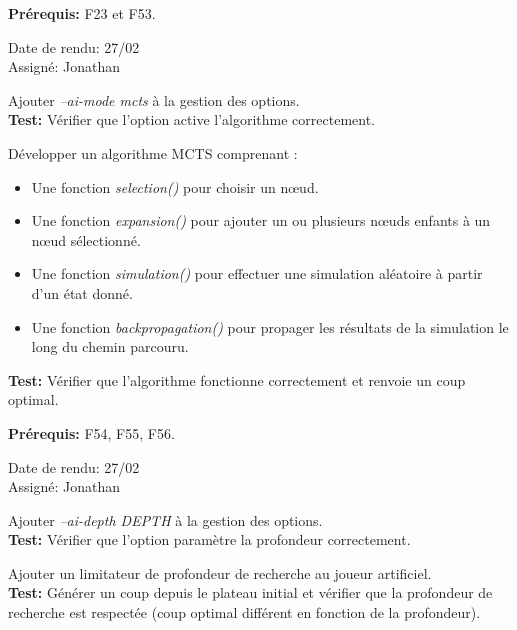 \documentclass{article}
\begin{document}
\begin{needbox}
    \textbf{Prérequis:} F23 et F53.
    \begin{duedatebox}
        Date de rendu: 27/02\\
        Assigné: Jonathan
    \end{duedatebox}
    \begin{subneedbox}
        Ajouter \textit{--ai-mode mcts} à la gestion des options.\\
        \textbf{Test:} Vérifier que l'option active l'algorithme correctement.
    \end{subneedbox}

    \begin{subneedbox}
        Développer un algorithme MCTS comprenant :
        \begin{itemize}
            \item Une fonction \textit{selection()} pour choisir un nœud.
            \item Une fonction \textit{expansion()} pour ajouter un ou plusieurs nœuds enfants à un nœud sélectionné.
            \item Une fonction \textit{simulation()} pour effectuer une simulation aléatoire à partir d'un état donné.
            \item Une fonction \textit{backpropagation()} pour propager les résultats de la simulation le long du chemin parcouru.
        \end{itemize}
        \textbf{Test:} Vérifier que l'algorithme fonctionne correctement et renvoie un coup optimal.
    \end{subneedbox}
\end{needbox}

\begin{needbox}
    \textbf{Prérequis:} F54, F55, F56.
    \begin{duedatebox}
        Date de rendu: 27/02\\
        Assigné: Jonathan
    \end{duedatebox}
    \begin{subneedbox}
        Ajouter \textit{--ai-depth DEPTH} à la gestion des options.\\
        \textbf{Test:} Vérifier que l'option paramètre la profondeur correctement.
    \end{subneedbox}
    \begin{subneedbox}
        Ajouter un limitateur de profondeur de recherche au joueur artificiel.\\
        \textbf{Test:} Générer un coup depuis le plateau initial et vérifier que la profondeur de recherche est respectée (coup optimal différent en fonction de la profondeur).
    \end{subneedbox}
\end{needbox}
\end{document}
